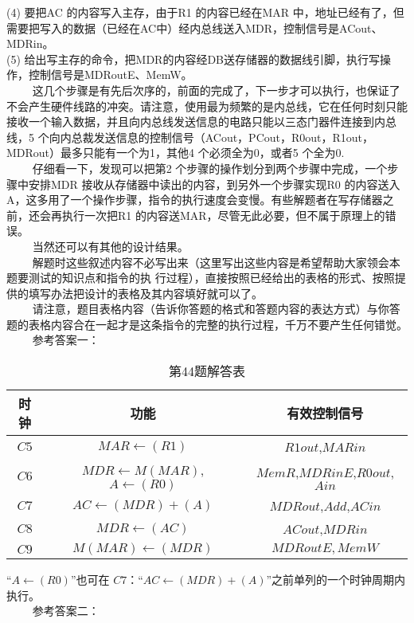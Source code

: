 (4) 要把AC 的内容写入主存，由于R1 的内容已经在MAR 中，地址已经有了，但需要把写入的数据（已经在AC中）经内总线送入MDR，控制信号是ACout、MDRin。 \\
(5) 给出写主存的命令，把MDR的内容经DB送存储器的数据线引脚，执行写操作，控制信号是MDRoutE、MemW。 \\
$\qquad$ 这几个步骤是有先后次序的，前面的完成了，下一步才可以执行，也保证了不会产生硬件线路的冲突。请注意，使用最为频繁的是内总线，它在任何时刻只能接收一个输入数据，并且向内总线发送信息的电路只能以三态门器件连接到内总线，5 个向内总裁发送信息的控制信号（ACout，PCout，R0out，R1out，MDRout）最多只能有一个为1，其他4 个必须全为0，或者5 个全为0. \\
$\qquad$ 仔细看一下，发现可以把第2 个步骤的操作划分到两个步骤中完成，一个步骤中安排MDR 接收从存储器中读出的内容，到另外一个步骤实现R0 的内容送入A，这多用了一个操作步骤，指令的执行速度会变慢。有些解题者在写存储器之前，还会再执行一次把R1 的内容送MAR，尽管无此必要，但不属于原理上的错误。 \\
$\qquad$ 当然还可以有其他的设计结果。 \\
$\qquad$ 解题时这些叙述内容不必写出来（这里写出这些内容是希望帮助大家领会本题要测试的知识点和指令的执
行过程），直接按照已经给出的表格的形式、按照提供的填写办法把设计的表格及其内容填好就可以了。 \\
$\qquad$ 请注意，题目表格内容（告诉你答题的格式和答题内容的表达方式）与你答题的表格内容合在一起才是这条指令的完整的执行过程，千万不要产生任何错觉。 \\
$\qquad$ 参考答案一：
\begin{table}[ht]
\centering
\caption{第44题解答表}\label{CSN09_tab6}
\begin{tabular}{|c|c|c|}
\hline
时钟 & 功能 & 有效控制信号 \\
\hline
$C5$ & $MAR\leftarrow(R1)$ & $R1out$,$MARin$ \\
\hline
$C6$ & $MDR\leftarrow M(MAR)$, $A\leftarrow(R0)$ & $MemR$,$MDRinE$,$R0out$,$Ain$ \\
\hline
$C7$ & $AC\leftarrow(MDR)+(A)$ & $MDRout$,$Add$,$ACin$ \\
\hline
$C8$ & $MDR\leftarrow(AC)$ & $ACout$,$MDRin$ \\
\hline
$C9$ & $M(MAR)\leftarrow(MDR)$ & $MDRoutE,MemW$ \\
\hline
\end{tabular}
\end{table}
“$A\leftarrow(R0)$”也可在 $C7$：“$AC\leftarrow(MDR)+(A)$”之前单列的一个时钟周期内执行。 \\
$\qquad$ 参考答案二： \\
